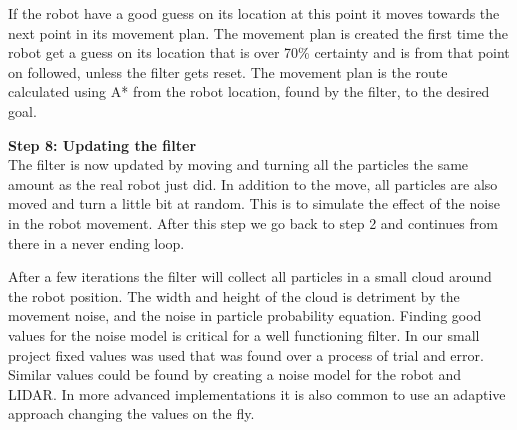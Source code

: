 If the robot have a good guess on its location at this point it moves towards the next point in its movement plan. The movement plan is created the first time the robot get a guess on its location that is over 70\% certainty and is from that point on followed, unless the filter gets reset. The movement plan is the route calculated using A* from the robot location, found by the filter, to the desired goal. 

\textbf{Step 8: Updating the filter}\\
The filter is now updated by moving and turning all the particles the same amount as the real robot just did. In addition to the move, all particles are also moved and turn a little bit at random. This is to simulate the effect of the noise in the robot movement. After this step we go back to step 2 and continues from there in a never ending loop. 

After a few iterations the filter will collect all particles in a small cloud around the robot position. The width and height of the cloud is detriment by the movement noise, and the noise in particle probability equation. Finding good values for the noise model is critical for a well functioning filter. In our small project fixed values was used that was found over a process of trial and error.  Similar values could be found by creating a noise model for the robot and LIDAR. In more advanced implementations it is also common to use an adaptive approach changing the values on the fly. 

 

